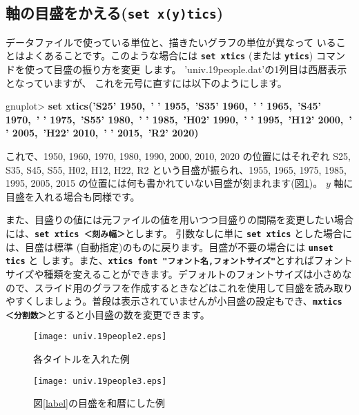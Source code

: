 \documentclass[a4j]{ujarticle} %
\newenvironment{terminal}{%
  \begin{center}
   \begin{minipage}{.8\textwidth}
    \setlength{\FrameSep}{.5\FrameSep}%
    \begin{framed}\ttfamily\small%
     \setlength\baselineskip{.85\baselineskip}%
}{%
    \end{framed}
   \end{minipage}
  \end{center}%
}
\begin{document}
\subsection{軸の目盛をかえる({\tt\bf set x(y)tics})}\label{ticsec}
データファイルで使っている単位と、描きたいグラフの単位が異なって
いることはよくあることです。このような場合には {\tt\bf set
xtics} (または {\tt\bf ytics}) コマンドを使って目盛の振り方を変更
します。
'univ.19people.dat'の1列目は西暦表示となっていますが、 これを元号に直すには以下のようにします。
\begin{terminal}
gnuplot> {\bf set xtics('S25' 1950,\ ' ' 1955,\  'S35' 1960,\ ' ' 1965,\ 'S45' 1970,\ ' ' 1975,\ 'S55' 1980,\ ' ' 1985,\  'H02' 1990,\ ' ' 1995,\ 'H12' 2000,\ ' ' 2005,\  'H22' 2010,\ ' ' 2015,\ 'R2' 2020)}
\end{terminal}
これで、1950, 1960, 1970, 1980, 1990, 2000, 2010, 2020 の位置にはそれぞれ S25, S35, S45, S55, H02, H12, H22, R2 という目盛が振られ、1955, 1965, 1975, 1985, 1995, 2005, 2015 の位置には何も書かれていない目盛が刻まれます(図\ref{tics})。
$y$ 軸に目盛を入れる場合も同様です。

また、目盛りの値には元ファイルの値を用いつつ目盛りの間隔を変更したい場合には、{\tt\bf set xtics ＜刻み幅＞}とします。 引数なしに単に {\tt\bf set xtics} とした場合には、目盛は標準 (自動指定)のものに戻ります。目盛が不要の場合には {\tt\bf unset tics} と します。また、{\tt\bf xtics font "フォント名,フォントサイズ"}とすればフォントサイズや種類を変えることができます。デフォルトのフォントサイズは小さめなので、スライド用のグラフを作成するときなどはこれを使用して目盛を読み取りやすくしましょう。普段は表示されていませんが小目盛の設定もでき、{\tt\bf mxtics ＜分割数＞}とすると小目盛の数を変更できます。

\begin{figure}
\begin{minipage}[hbtp]{0.49\textwidth}
\begin{center}
\texttt{[image: univ.19people2.eps]}
\caption{各タイトルを入れた例}
\label{label}
\end{center}
\end{minipage}
\begin{minipage}[hbtp]{0.49\textwidth}
\begin{center}
\texttt{[image: univ.19people3.eps]}
\caption{図\ref{label}の目盛を和暦にした例}
\label{tics}
\end{center}
\end{minipage}
\end{figure}
\end{document}
